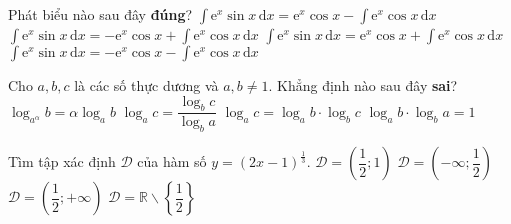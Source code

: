 \begin{ex}%
	Phát biểu nào sau đây \textbf{đúng}?	
	\choice
	{$ \displaystyle\int\limits \mathrm e^x \sin x\mathrm{\,d}x=\mathrm e^x\cos x-\displaystyle\int\limits \mathrm e^x \cos x\mathrm{\,d}x$}
	{\True $ \displaystyle\int\limits \mathrm e^x \sin x\mathrm{\,d}x=-\mathrm e^x\cos x+\displaystyle\int\limits \mathrm e^x \cos x\mathrm{\,d}x$}
	{$ \displaystyle\int\limits \mathrm e^x\sin x\mathrm{\,d}x=\mathrm e^x\cos x+\displaystyle\int\limits \mathrm e^x \cos x\mathrm{\,d}x$}
	{$ \displaystyle\int\limits \mathrm e^x \sin x\mathrm{\,d}x=-\mathrm e^x\cos x-\displaystyle\int\limits \mathrm e^x \cos x\mathrm{\,d}x$}
\end{ex}
\begin{ex}%
Cho $ a,b,c $ là các số thực dương và $ a,b \ne 1$. Khẳng định nào sau đây \textbf{sai}? 
	\choice
{\True $ \log_{a^{\alpha}} {b}=\alpha \log_a b $}
{$ \log_a c=\dfrac{\log_b c}{\log_b a} $}
{$ \log_a c= \log_a b \cdot \log_b c $}
{$ \log_a b \cdot \log_b a=1 $}
\end{ex}
\begin{ex}%
Tìm tập xác định $ \mathscr{D} $ của hàm số $ y=\left(2x-1\right)^{\frac{1}{3}}$. 
	\choice
	{$ \mathscr D =\left(\dfrac{1}{2};1\right)$}
	{$ \mathscr D =\left(-\infty;\dfrac{1}{2}\right)$}
	{\True $ \mathscr D =\left(\dfrac{1}{2};+\infty\right)$}
	{$ \mathscr D =\mathbb R \backslash \left\{\dfrac{1}{2} \right \}$}
\end{ex}

